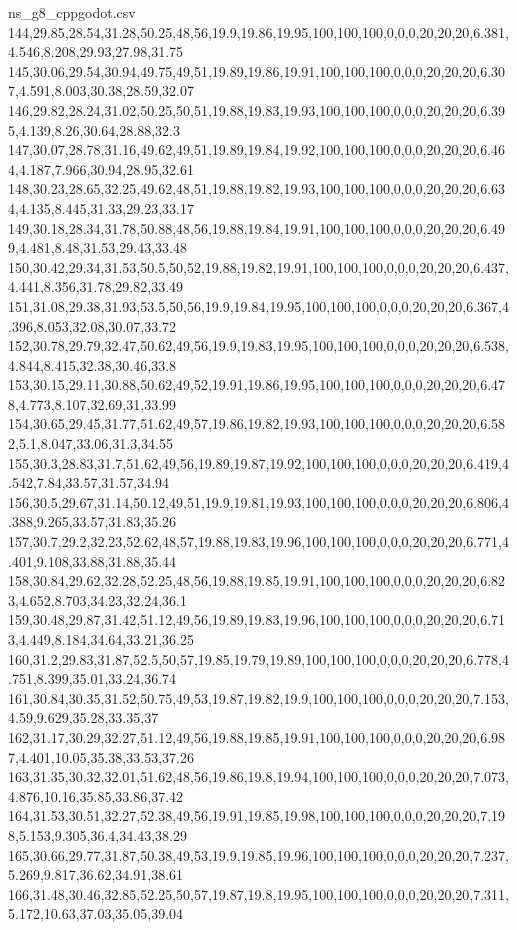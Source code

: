 \begin{filecontents*}[overwrite]{ns_g8_cppgodot.csv}
144,29.85,28.54,31.28,50.25,48,56,19.9,19.86,19.95,100,100,100,0,0,0,20,20,20,6.381,4.546,8.208,29.93,27.98,31.75
145,30.06,29.54,30.94,49.75,49,51,19.89,19.86,19.91,100,100,100,0,0,0,20,20,20,6.307,4.591,8.003,30.38,28.59,32.07
146,29.82,28.24,31.02,50.25,50,51,19.88,19.83,19.93,100,100,100,0,0,0,20,20,20,6.395,4.139,8.26,30.64,28.88,32.3
147,30.07,28.78,31.16,49.62,49,51,19.89,19.84,19.92,100,100,100,0,0,0,20,20,20,6.464,4.187,7.966,30.94,28.95,32.61
148,30.23,28.65,32.25,49.62,48,51,19.88,19.82,19.93,100,100,100,0,0,0,20,20,20,6.634,4.135,8.445,31.33,29.23,33.17
149,30.18,28.34,31.78,50.88,48,56,19.88,19.84,19.91,100,100,100,0,0,0,20,20,20,6.499,4.481,8.48,31.53,29.43,33.48
150,30.42,29.34,31.53,50.5,50,52,19.88,19.82,19.91,100,100,100,0,0,0,20,20,20,6.437,4.441,8.356,31.78,29.82,33.49
151,31.08,29.38,31.93,53.5,50,56,19.9,19.84,19.95,100,100,100,0,0,0,20,20,20,6.367,4.396,8.053,32.08,30.07,33.72
152,30.78,29.79,32.47,50.62,49,56,19.9,19.83,19.95,100,100,100,0,0,0,20,20,20,6.538,4.844,8.415,32.38,30.46,33.8
153,30.15,29.11,30.88,50.62,49,52,19.91,19.86,19.95,100,100,100,0,0,0,20,20,20,6.478,4.773,8.107,32.69,31,33.99
154,30.65,29.45,31.77,51.62,49,57,19.86,19.82,19.93,100,100,100,0,0,0,20,20,20,6.582,5.1,8.047,33.06,31.3,34.55
155,30.3,28.83,31.7,51.62,49,56,19.89,19.87,19.92,100,100,100,0,0,0,20,20,20,6.419,4.542,7.84,33.57,31.57,34.94
156,30.5,29.67,31.14,50.12,49,51,19.9,19.81,19.93,100,100,100,0,0,0,20,20,20,6.806,4.388,9.265,33.57,31.83,35.26
157,30.7,29.2,32.23,52.62,48,57,19.88,19.83,19.96,100,100,100,0,0,0,20,20,20,6.771,4.401,9.108,33.88,31.88,35.44
158,30.84,29.62,32.28,52.25,48,56,19.88,19.85,19.91,100,100,100,0,0,0,20,20,20,6.823,4.652,8.703,34.23,32.24,36.1
159,30.48,29.87,31.42,51.12,49,56,19.89,19.83,19.96,100,100,100,0,0,0,20,20,20,6.713,4.449,8.184,34.64,33.21,36.25
160,31.2,29.83,31.87,52.5,50,57,19.85,19.79,19.89,100,100,100,0,0,0,20,20,20,6.778,4.751,8.399,35.01,33.24,36.74
161,30.84,30.35,31.52,50.75,49,53,19.87,19.82,19.9,100,100,100,0,0,0,20,20,20,7.153,4.59,9.629,35.28,33.35,37
162,31.17,30.29,32.27,51.12,49,56,19.88,19.85,19.91,100,100,100,0,0,0,20,20,20,6.987,4.401,10.05,35.38,33.53,37.26
163,31.35,30.32,32.01,51.62,48,56,19.86,19.8,19.94,100,100,100,0,0,0,20,20,20,7.073,4.876,10.16,35.85,33.86,37.42
164,31.53,30.51,32.27,52.38,49,56,19.91,19.85,19.98,100,100,100,0,0,0,20,20,20,7.198,5.153,9.305,36.4,34.43,38.29
165,30.66,29.77,31.87,50.38,49,53,19.9,19.85,19.96,100,100,100,0,0,0,20,20,20,7.237,5.269,9.817,36.62,34.91,38.61
166,31.48,30.46,32.85,52.25,50,57,19.87,19.8,19.95,100,100,100,0,0,0,20,20,20,7.311,5.172,10.63,37.03,35.05,39.04

\end{filecontents*}
